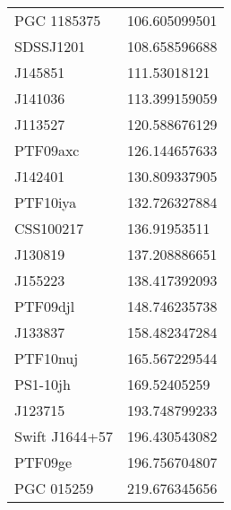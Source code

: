 \documentclass[]{article}
\begin{document}
\begin{tabular}{ |p{5cm}||p{5cm}|}
PGC 1185375 & \num[round-precision=2, round-mode=figures, scientific-notation=true]{106.605099501}  \\ 
SDSSJ1201 & \num[round-precision=2, round-mode=figures, scientific-notation=true]{108.658596688}  \\ 
J145851 & \num[round-precision=2, round-mode=figures, scientific-notation=true]{111.53018121}  \\ 
J141036 & \num[round-precision=2, round-mode=figures, scientific-notation=true]{113.399159059}  \\ 
J113527 & \num[round-precision=2, round-mode=figures, scientific-notation=true]{120.588676129}  \\ 
PTF09axc & \num[round-precision=2, round-mode=figures, scientific-notation=true]{126.144657633}  \\ 
J142401 & \num[round-precision=2, round-mode=figures, scientific-notation=true]{130.809337905}  \\ 
PTF10iya & \num[round-precision=2, round-mode=figures, scientific-notation=true]{132.726327884}  \\ 
CSS100217 & \num[round-precision=2, round-mode=figures, scientific-notation=true]{136.91953511}  \\ 
J130819 & \num[round-precision=2, round-mode=figures, scientific-notation=true]{137.208886651}  \\ 
J155223 & \num[round-precision=2, round-mode=figures, scientific-notation=true]{138.417392093}  \\ 
PTF09djl & \num[round-precision=2, round-mode=figures, scientific-notation=true]{148.746235738}  \\ 
J133837 & \num[round-precision=2, round-mode=figures, scientific-notation=true]{158.482347284}  \\ 
PTF10nuj & \num[round-precision=2, round-mode=figures, scientific-notation=true]{165.567229544}  \\ 
PS1-10jh & \num[round-precision=2, round-mode=figures, scientific-notation=true]{169.52405259}  \\ 
J123715 & \num[round-precision=2, round-mode=figures, scientific-notation=true]{193.748799233}  \\ 
Swift J1644+57 & \num[round-precision=2, round-mode=figures, scientific-notation=true]{196.430543082}  \\ 
PTF09ge & \num[round-precision=2, round-mode=figures, scientific-notation=true]{196.756704807}  \\ 
PGC 015259 & \num[round-precision=2, round-mode=figures, scientific-notation=true]{219.676345656}  \\ 

\end{tabular}
\end{document}
